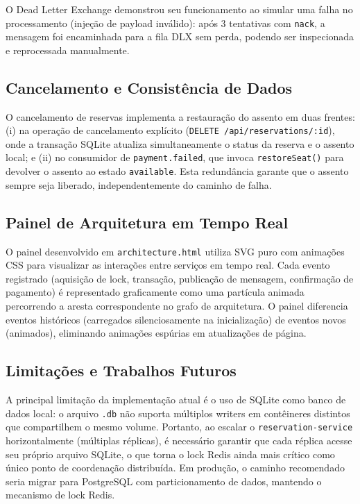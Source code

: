 \documentclass[12pt]{article}
\begin{document}
O Dead Letter Exchange demonstrou seu funcionamento ao simular uma falha no processamento
(injeção de payload inválido): após 3 tentativas com \texttt{nack}, a mensagem foi
encaminhada para a fila DLX sem perda, podendo ser inspecionada e reprocessada
manualmente.

\subsection{Cancelamento e Consistência de Dados}

O cancelamento de reservas implementa a restauração do assento em duas frentes: (i) na
operação de cancelamento explícito (\texttt{DELETE /api/reservations/:id}), onde a
transação SQLite atualiza simultaneamente o status da reserva e o assento local; e (ii)
no consumidor de \texttt{payment.failed}, que invoca \texttt{restoreSeat()} para
devolver o assento ao estado \texttt{available}. Esta redundância garante que o assento
sempre seja liberado, independentemente do caminho de falha.

\subsection{Painel de Arquitetura em Tempo Real}

O painel desenvolvido em \texttt{architecture.html} utiliza SVG puro com animações CSS
para visualizar as interações entre serviços em tempo real. Cada evento registrado
(aquisição de lock, transação, publicação de mensagem, confirmação de pagamento) é
representado graficamente como uma partícula animada percorrendo a aresta correspondente
no grafo de arquitetura. O painel diferencia eventos históricos (carregados silenciosamente
na inicialização) de eventos novos (animados), eliminando animações espúrias em
atualizações de página.

\subsection{Limitações e Trabalhos Futuros}

A principal limitação da implementação atual é o uso de SQLite como banco de dados
local: o arquivo \texttt{.db} não suporta múltiplos writers em contêineres distintos
que compartilhem o mesmo volume. Portanto, ao escalar o \texttt{reservation-service}
horizontalmente (múltiplas réplicas), é necessário garantir que cada réplica acesse
seu próprio arquivo SQLite, o que torna o lock Redis ainda mais crítico como único
ponto de coordenação distribuída. Em produção, o caminho recomendado seria migrar
para PostgreSQL com particionamento de dados, mantendo o mecanismo de lock Redis.
\end{document}
